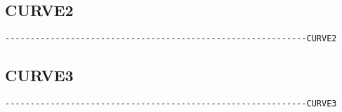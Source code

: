 
\subsection{CURVE2}
\begin{verbatim}
------------------------------------------------------------CURVE2
\end{verbatim}


\subsection{CURVE3}
\begin{verbatim}
------------------------------------------------------------CURVE3
\end{verbatim}


